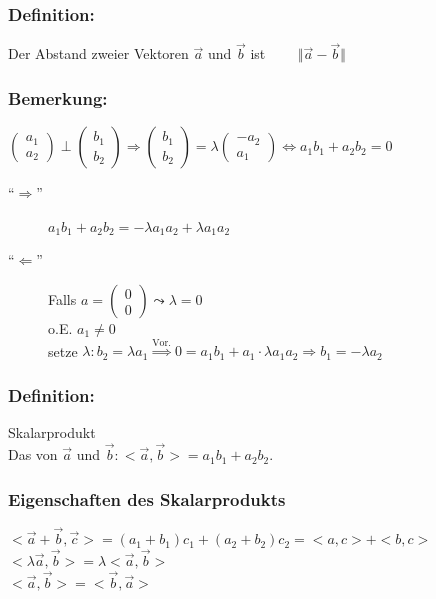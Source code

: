 \subsubsection{Definition:}
Der Abstand zweier Vektoren $\vec{a}$ und $\vec{b}$ ist $ \qquad \Vert \vec{a}-\vec{b} \Vert$
%
%
%
\subsubsection{Bemerkung:}
$\begin{pmatrix} a_{1} \\ a_{2} \end{pmatrix} \perp \begin{pmatrix} b_{1} \\ b_{2} \end{pmatrix} \Rightarrow \begin{pmatrix} b_{1} \\ b_{2} \end{pmatrix} = \lambda \begin{pmatrix} -a_{2} \\ a_{1} \end{pmatrix} \Leftrightarrow a_{1}b_{1}+a_{2}b_{2}=0$
\begin{description}
	\item["`$\Rightarrow$"'] $a_{1}b_{1}+a_{2}b_{2}= -\lambda a_{1}a_{2} + \lambda 
		a_{1}a_{2}$
	\item["`$\Leftarrow$"'] Falls $ a = \begin{pmatrix} 0 \\ 0 \end{pmatrix} \leadsto 
		\lambda = 0$ \\ 
		o.E. $a_{1} \neq 0 $ \\
		setze $\lambda: b_{2} = \lambda a_{1} \mathop{\Rightarrow}\limits^{\text{Vor.}} 
		0 = a_{1}b_{1}+ a_{1}\cdot\lambda a_{1}a_{2} \Rightarrow b_{1} = - 
		\lambda a_{2}$
\end{description}
%
%
%
\subsubsection{Definition:}
Skalarprodukt\\
Das von $\vec{a}$ und $\vec{b}: <\vec{a},\vec{b}> = a_{1}b_{1}+a_{2}b_{2}$.
%
%
%
\subsubsection{Eigenschaften des Skalarprodukts}
$<\vec{a}+\vec{b},\vec{c}>=(a_{1}+b_{1})c_{1}+(a_{2}+b_{2})c_{2}=<a,c>+<b,c>$\\
$<\lambda \vec{a},\vec{b}>=\lambda <\vec{a},\vec{b}>$\\
$<\vec{a},\vec{b}>=<\vec{b},\vec{a}>$
%
%
%
